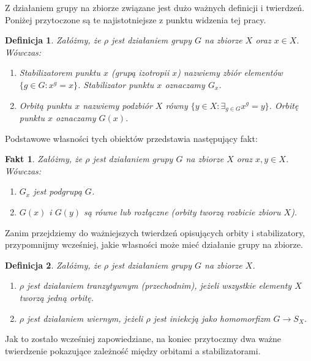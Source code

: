 \documentclass[licencjacka]{pracamgr}
\newtheorem{deff}{Definicja}[section]
\newtheorem{fact}{Fakt}[section]
\begin{document}
Z działaniem grupy na zbiorze związane jest dużo ważnych definicji i twierdzeń.
Poniżej przytoczone są te najistotniejsze z punktu widzenia tej pracy.

\begin{deff}
	Załóżmy, że $\rho$ jest działaniem grupy $G$ na zbiorze $X$ oraz $x \in X$. Wówczas:
	\begin{enumerate}[label=\alph*)]
	 \item \emph{Stabilizatorem punktu $x$ (grupą izotropii $x$)} nazwiemy zbiór elementów $\{g \in G\colon x^g = x \}$. 
					Stabilizator punktu $x$ oznaczamy $G_x$.
	 \item \emph{Orbitą punktu $x$} nazwiemy podzbiór $X$ równy $\{y \in X \colon \exists_{g \in G} x^g = y \}$.
					Orbitę punktu $x$ oznaczamy $G(x)$.
	\end{enumerate}
\end{deff}

Podstawowe własności tych obiektów przedstawia następujący fakt:
\begin{fact}
	Załóżmy, że $\rho$ jest działaniem grupy $G$ na zbiorze $X$ oraz $x, y \in X$. Wówczas:
	\begin{enumerate}[label=\alph*)]
	 \item $G_x$ jest podgrupą $G$.
	 \item $G(x)$ i $G(y)$ są równe lub rozłączne (orbity tworzą rozbicie zbioru $X$).
	\end{enumerate}
\end{fact}

Zanim przejdziemy do ważniejszych twierdzeń opisujących orbity i stabilizatory, 
przypomnijmy wcześniej, jakie własności może mieć działanie grupy na zbiorze.

\begin{deff}
	Załóżmy, że $\rho$ jest działaniem grupy $G$ na zbiorze $X$.
	\begin{enumerate}[label=\alph*)]
	 \item \emph{$\rho$ jest działaniem tranzytywnym (przechodnim)}, jeżeli wszystkie elementy $X$ tworzą jedną orbitę.
	 \item \emph{$\rho$ jest działaniem wiernym}, jeżeli $\rho$ jest iniekcją jako homomorfizm $G \to S_X$.
	\end{enumerate}
\end{deff}

Jak to zostało wcześniej zapowiedziane, na koniec przytoczmy dwa ważne twierdzenie pokazujące zależność między orbitami a stabilizatorami.
\end{document}
